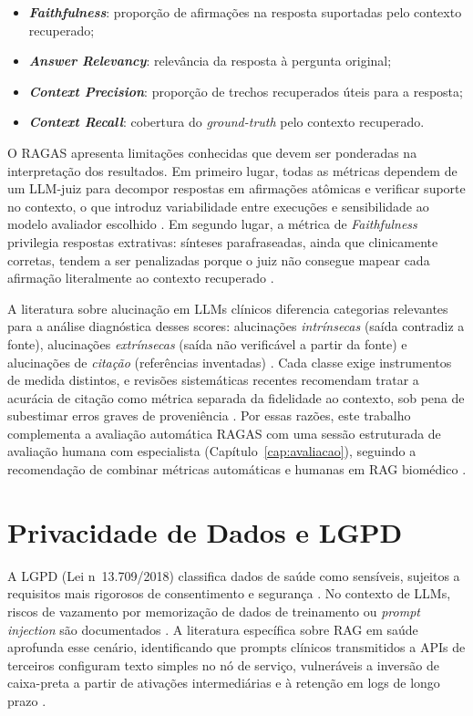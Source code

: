 \documentclass[
  12pt,
  oneside,
  a4paper,
  english,
  brazil
]{abntex2}
\begin{document}
\begin{itemize}
  \item \textbf{\textit{Faithfulness}}: proporção de afirmações na resposta
        suportadas pelo contexto recuperado;
  \item \textbf{\textit{Answer Relevancy}}: relevância da resposta à pergunta
        original;
  \item \textbf{\textit{Context Precision}}: proporção de trechos recuperados
        úteis para a resposta;
  \item \textbf{\textit{Context Recall}}: cobertura do \textit{ground-truth}
        pelo contexto recuperado.
\end{itemize}

O RAGAS apresenta limitações conhecidas que devem ser ponderadas na interpretação dos
resultados. Em primeiro lugar, todas as métricas dependem de um LLM-juiz para decompor
respostas em afirmações atômicas e verificar suporte no contexto, o que introduz
variabilidade entre execuções e sensibilidade ao modelo avaliador escolhido
\cite{es2024}. Em segundo lugar, a métrica de \textit{Faithfulness} privilegia
respostas extrativas: sínteses parafraseadas, ainda que clinicamente corretas, tendem a
ser penalizadas porque o juiz não consegue mapear cada afirmação literalmente ao
contexto recuperado \cite{bang2023}.

A literatura sobre alucinação em LLMs clínicos diferencia categorias relevantes para a
análise diagnóstica desses scores: alucinações \textit{intrínsecas} (saída contradiz a
fonte), alucinações \textit{extrínsecas} (saída não verificável a partir da fonte) e
alucinações de \textit{citação} (referências inventadas) \cite{ocaf2024}. Cada classe
exige instrumentos de medida distintos, e revisões sistemáticas recentes recomendam
tratar a acurácia de citação como métrica separada da fidelidade ao contexto, sob pena
de subestimar erros graves de proveniência \cite{privacyRAGHealthcare2025}. Por essas
razões, este trabalho complementa a avaliação automática RAGAS com uma sessão
estruturada de avaliação humana com especialista (Capítulo~\ref{cap:avaliacao}),
seguindo a recomendação de combinar métricas automáticas e humanas em RAG biomédico
\cite{ocaf2024}.

\section{Privacidade de Dados e LGPD}
\label{sec:lgpd-ref}

A LGPD (Lei n\textordmasculine\ 13.709/2018) classifica dados de saúde como sensíveis,
sujeitos a requisitos mais rigorosos de consentimento e segurança \cite{lgpdSaude2023,
lgpdEnfermagem2022}. No contexto de LLMs, riscos de vazamento por memorização de
dados de treinamento ou \textit{prompt injection} são documentados
\cite{sokPrivacyLLM2026, privacyEHRLLMs2025}. A literatura específica sobre RAG em
saúde aprofunda esse cenário, identificando que prompts clínicos transmitidos a APIs
de terceiros configuram texto simples no nó de serviço, vulneráveis a inversão de
caixa-preta a partir de ativações intermediárias e à retenção em logs de longo prazo
\cite{privacyRAGHealthcare2025}.
\end{document}
